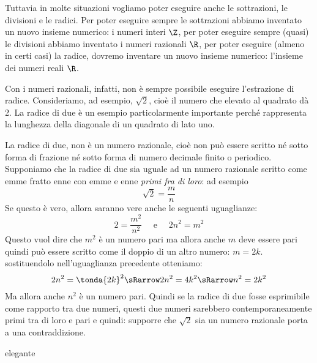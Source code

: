 Tuttavia in molte situazioni vogliamo poter eseguire anche le sottrazioni, 
le divisioni e le radici. Per poter eseguire sempre le sottrazioni abbiamo 
inventato un nuovo insieme numerico: i numeri interi \(\Z\), per poter 
eseguire sempre (quasi) le divisioni abbiamo inventato i numeri razionali 
\(\R\), per poter eseguire (almeno in certi casi) la radice, dovremo 
inventare un nuovo insieme numerico: l'insieme dei numeri reali \(\R\).

Con i numeri razionali, infatti, non è sempre possibile eseguire 
l'estrazione di radice. Consideriamo, ad esempio, \(\sqrt{2}\), cioè il 
numero 
che elevato al quadrato dà 2. La radice di due è un esempio particolarmente 
importante perché rappresenta la lunghezza della diagonale di un quadrato 
di lato uno.

\begin{center}
 
\end{center}

La radice di due, non è un numero razionale, cioè non può essere scritto né 
sotto forma di frazione né sotto forma di numero decimale finito o 
periodico. 
Supponiamo che la radice di due sia uguale ad un numero razionale scritto 
come emme fratto enne con emme e enne \emph{primi fra di loro}: ad esempio 
\[\sqrt{2}=\dfrac{m}{n}\]
Se questo è vero, allora saranno vere anche le seguenti uguaglianze:
\[2= \dfrac{m^2}{n^2} \quad \text{ e } \quad 2n^2 = m^2\]
Questo vuol dire che \(m^2\) è un numero pari ma allora anche \(m\) deve 
essere pari quindi può essere scritto come il doppio di un altro numero:
\(m=2k\). sostituendolo nell'uguaglianza precedente otteniamo:
\[2n^2 = \tonda{2k}^2 \sRarrow 2n^2 = 4k^2 \sRarrow n^2 = 2k^2\]
Ma allora anche \(n^2\) è un numero pari. Quindi se la radice di due fosse 
esprimibile come rapporto tra due numeri, questi due numeri sarebbero 
contemporaneamente primi tra di loro e pari e quindi: supporre che 
\(\sqrt{2}\) sia un numero razionale porta a una contraddizione.

elegante 

